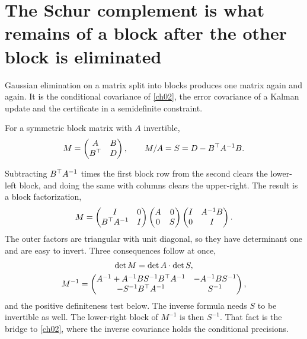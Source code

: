 \section{The Schur complement is what remains of a block after the other block is eliminated}\label{sec:ch01:schur}

Gaussian elimination on a matrix split into blocks produces one matrix again
and again. It is the conditional covariance of \cref{ch02}, the error covariance
of a Kalman update and the certificate in a semidefinite constraint.

\begin{definition}\label{def:ch01:schur}
For a symmetric block matrix with $A$ invertible,
\begin{equation}\label{eq:ch01:schur}
M=\begin{pmatrix}A&B\\B^{\top}&D\end{pmatrix},\qquad M/A=S=D-B^{\top} A^{-1}B .
\end{equation}
\end{definition}

Subtracting $B^{\top} A^{-1}$ times the first block row from the second clears the
lower-left block, and doing the same with columns clears the upper-right. The
result is a block factorization,
\begin{equation}\label{eq:ch01:ldu}
M=\begin{pmatrix}I&0\\B^{\top} A^{-1}&I\end{pmatrix}
\begin{pmatrix}A&0\\0&S\end{pmatrix}
\begin{pmatrix}I&A^{-1}B\\0&I\end{pmatrix}.
\end{equation}
The outer factors are triangular with unit diagonal, so they have determinant
one and are easy to invert. Three consequences follow at once,
\begin{gather}
\det M=\det A\cdot\det S, \label{eq:ch01:schurdet}\\
M^{-1}=\begin{pmatrix}A^{-1}+A^{-1}BS^{-1}B^{\top} A^{-1}&-A^{-1}BS^{-1}\\-S^{-1}B^{\top} A^{-1}&S^{-1}\end{pmatrix}, \label{eq:ch01:schurinv}
\end{gather}
and the positive definiteness test below. The inverse formula needs $S$ to be
invertible as well. The lower-right block of $M^{-1}$ is then
$S^{-1}$. That fact is the bridge to \cref{ch02}, where the inverse covariance
holds the conditional precisions.

